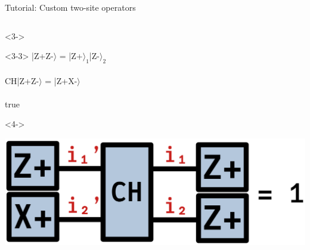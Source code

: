 \begin{frame}[fragile]{Tutorial: Custom two-site operators}
\begin{columns}
\begin{column}{5cm}
\begin{onlyenv}<3->
~\\
\end{onlyenv}

\begin{onlyenv}<3-3>
|Z+Z-$\rangle$ = |Z+$\rangle_1$|Z-$\rangle_2$ \\
~\\
CH|Z+Z-$\rangle$ = |Z+X-$\rangle$ \\
~\\
true
\end{onlyenv}

\begin{onlyenv}<4->
\vspace*{0.0cm}
\begin{center}
\includegraphics[width=1.0\textwidth]{
  slides/assets/Zp1Xp2CHZp1Zp2.png
}
\end{center}
\vspace*{0.0cm}
\end{onlyenv}

\end{column}

\end{columns}

\end{frame}
